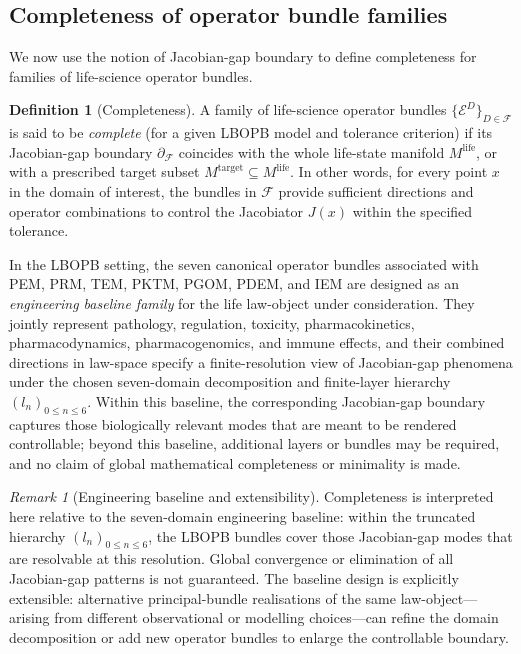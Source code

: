 \documentclass[11pt]{book}
\theoremstyle{plain}
\theoremstyle{definition}
\newtheorem{definition}[theorem]{Definition}
\theoremstyle{remark}
\newtheorem{remark}[theorem]{Remark}
\begin{document}
\subsection*{Completeness of operator bundle families}

We now use the notion of Jacobian-gap boundary to define completeness
for families of life-science operator bundles.

\begin{definition}[Completeness]
A family of life-science operator bundles
$\{\mathcal{E}^{D}\}_{D \in \mathcal{F}}$ is said to be
\emph{complete} (for a given LBOPB model and tolerance criterion) if
its Jacobian-gap boundary $\partial_{\mathcal{F}}$ coincides with the
whole life-state manifold $M^{\mathrm{life}}$, or with a prescribed
target subset $M^{\mathrm{target}} \subseteq M^{\mathrm{life}}$. In
other words, for every point $x$ in the domain of interest, the
bundles in $\mathcal{F}$ provide sufficient directions and operator
combinations to control the Jacobiator $J(x)$ within the specified
tolerance.
\end{definition}

In the LBOPB setting, the seven canonical operator bundles associated
with PEM, PRM, TEM, PKTM, PGOM, PDEM, and IEM are designed as an
\emph{engineering baseline family} for the life law-object under
consideration. They jointly represent pathology, regulation, toxicity,
pharmacokinetics, pharmacodynamics, pharmacogenomics, and immune
effects, and their combined directions in law-space specify a
finite-resolution view of Jacobian-gap phenomena under the chosen
seven-domain decomposition and finite-layer hierarchy
$(l_n)_{0\le n\le 6}$. Within this baseline, the corresponding
Jacobian-gap boundary captures those biologically relevant modes that
are meant to be rendered controllable; beyond this baseline, additional
layers or bundles may be required, and no claim of global mathematical
completeness or minimality is made.

\begin{remark}[Engineering baseline and extensibility]
Completeness is interpreted here relative to the seven-domain
engineering baseline: within the truncated hierarchy
$(l_n)_{0 \le n \le 6}$, the LBOPB bundles cover those Jacobian-gap
modes that are resolvable at this resolution. Global convergence or
elimination of all Jacobian-gap patterns is not guaranteed. The
baseline design is explicitly extensible: alternative principal-bundle
realisations of the same law-object—arising from different
observational or modelling choices—can refine the domain decomposition
or add new operator bundles to enlarge the controllable boundary.
\end{remark}
\end{document}

